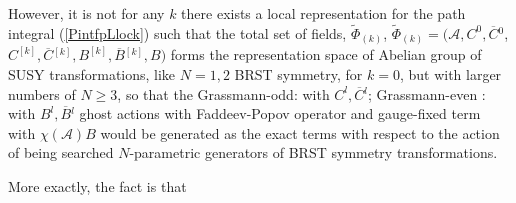 \documentclass[10pt]{article}
\begin{document}
However, it is not for any $k$  there exists a local representation for the path integral (\ref{PintfpLlock}) such that the total set of  fields, $\widetilde{\Phi}_{(k)}$, $\widetilde{\Phi}_{(k)}=(\mathcal{A}, C^0, \overline{C}{}^0$,  $C^{[k]}, \overline{C}{}^{[k]}, B^{[k]}, \overline{B}{}^{[k]}, B)$ forms the representation space of  Abelian group  of SUSY transformations, like $N=1,2$ BRST symmetry, for $k=0$, but with larger numbers of $N\geq 3$, so that the Grassmann-odd: with $C^l,\overline{C}{}^l$; Grassmann-even  : with $B^l,\overline{B}{}^l$ ghost actions with Faddeev-Popov operator and gauge-fixed term with $\chi( \mathcal{A})B$ would be generated as the  exact terms  with respect to the action of being searched  $N$-parametric generators of BRST symmetry transformations.

More exactly, the fact  is  that
\end{document}

